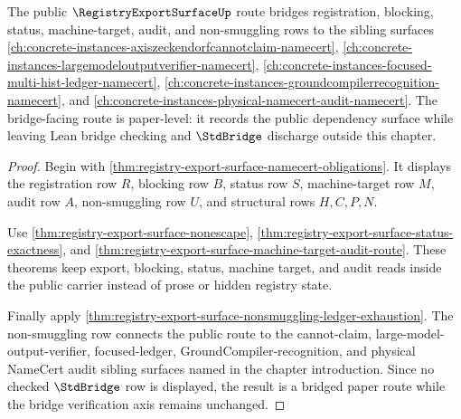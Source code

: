 \begin{theorem}
\label{thm:registry-export-surface-public-bridge-route}
The public $\RegistryExportSurfaceUp$ route bridges registration, blocking, status, machine-target, audit, and non-smuggling rows to the sibling surfaces \autoref{ch:concrete-instances-axiszeckendorfcannotclaim-namecert}, \autoref{ch:concrete-instances-largemodeloutputverifier-namecert}, \autoref{ch:concrete-instances-focused-multi-hist-ledger-namecert}, \autoref{ch:concrete-instances-groundcompilerrecognition-namecert}, and \autoref{ch:concrete-instances-physical-namecert-audit-namecert}. The bridge-facing route is paper-level: it records the public dependency surface while leaving Lean bridge checking and $\StdBridge$ discharge outside this chapter.
\end{theorem}
\begin{proof}
Begin with \autoref{thm:registry-export-surface-namecert-obligations}. It displays the registration row $R$, blocking row $B$, status row $S$, machine-target row $M$, audit row $A$, non-smuggling row $U$, and structural rows $H,C,P,N$.

Use \autoref{thm:registry-export-surface-nonescape}, \autoref{thm:registry-export-surface-status-exactness}, and \autoref{thm:registry-export-surface-machine-target-audit-route}. These theorems keep export, blocking, status, machine target, and audit reads inside the public carrier instead of prose or hidden registry state.

Finally apply \autoref{thm:registry-export-surface-nonsmuggling-ledger-exhaustion}. The non-smuggling row connects the public route to the cannot-claim, large-model-output-verifier, focused-ledger, GroundCompiler-recognition, and physical NameCert audit sibling surfaces named in the chapter introduction. Since no checked $\StdBridge$ row is displayed, the result is a bridged paper route while the bridge verification axis remains unchanged.
\end{proof}

